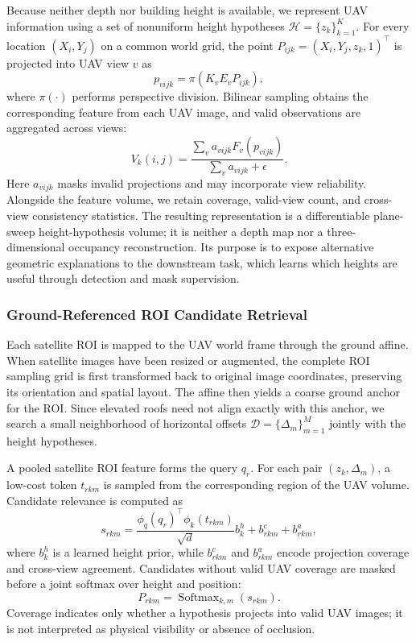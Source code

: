 \documentclass[letterpaper,journal]{IEEEtran}
\begin{document}
Because neither depth nor building height is available, we represent UAV information using a set of nonuniform height hypotheses $\mathcal{H}=\{z_k\}_{k=1}^{K}$. For every location $(X_i,Y_j)$ on a common world grid, the point $P_{ijk}=(X_i,Y_j,z_k,1)^{\top}$ is projected into UAV view $v$ as
\begin{equation}
p_{vijk}=\pi\!\left(K_vE_vP_{ijk}\right),
\end{equation}
where $\pi(\cdot)$ performs perspective division. Bilinear sampling obtains the corresponding feature from each UAV image, and valid observations are aggregated across views:
\begin{equation}
V_k(i,j)=
\frac{\sum_v a_{vijk}F_v(p_{vijk})}
{\sum_v a_{vijk}+\epsilon}.
\label{eq:height_volume}
\end{equation}
Here $a_{vijk}$ masks invalid projections and may incorporate view reliability. Alongside the feature volume, we retain coverage, valid-view count, and cross-view consistency statistics. The resulting representation is a differentiable plane-sweep height-hypothesis volume; it is neither a depth map nor a three-dimensional occupancy reconstruction. Its purpose is to expose alternative geometric explanations to the downstream task, which learns which heights are useful through detection and mask supervision.

\subsubsection{Ground-Referenced ROI Candidate Retrieval}
Each satellite ROI is mapped to the UAV world frame through the ground affine. When satellite images have been resized or augmented, the complete ROI sampling grid is first transformed back to original image coordinates, preserving its orientation and spatial layout. The affine then yields a coarse ground anchor for the ROI. Since elevated roofs need not align exactly with this anchor, we search a small neighborhood of horizontal offsets $\mathcal{D}=\{\Delta_m\}_{m=1}^{M}$ jointly with the height hypotheses.

A pooled satellite ROI feature forms the query $q_r$. For each pair $(z_k,\Delta_m)$, a low-cost token $t_{rkm}$ is sampled from the corresponding region of the UAV volume. Candidate relevance is computed as
\begin{equation}
s_{rkm}=
\frac{\phi_q(q_r)^{\top}\phi_k(t_{rkm})}{\sqrt{d}}
b^{h}_{k}+b^{c}_{rkm}+b^{a}_{rkm},
\label{eq:candidate_score}
\end{equation}
where $b^{h}_{k}$ is a learned height prior, while $b^{c}_{rkm}$ and $b^{a}_{rkm}$ encode projection coverage and cross-view agreement. Candidates without valid UAV coverage are masked before a joint softmax over height and position:
\begin{equation}
P_{rkm}=\operatorname{Softmax}_{k,m}(s_{rkm}).
\end{equation}
Coverage indicates only whether a hypothesis projects into valid UAV images; it is not interpreted as physical visibility or absence of occlusion.
\end{document}
